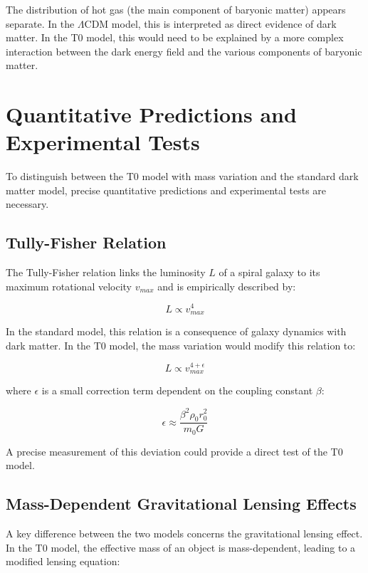 \documentclass[a4paper,12pt]{article}
\begin{document}
	The distribution of hot gas (the main component of baryonic matter) appears separate. In the $\Lambda$CDM model, this is interpreted as direct evidence of dark matter. In the T0 model, this would need to be explained by a more complex interaction between the dark energy field and the various components of baryonic matter.
	
	\section{Quantitative Predictions and Experimental Tests}
	
	To distinguish between the T0 model with mass variation and the standard dark matter model, precise quantitative predictions and experimental tests are necessary.
	
	\subsection{Tully-Fisher Relation}
	
	The Tully-Fisher relation links the luminosity $L$ of a spiral galaxy to its maximum rotational velocity $v_{max}$ and is empirically described by:
	
	\begin{equation}
		L \propto v_{max}^{4}
	\end{equation}
	
	In the standard model, this relation is a consequence of galaxy dynamics with dark matter. In the T0 model, the mass variation would modify this relation to:
	
	\begin{equation}
		L \propto v_{max}^{4+\epsilon}
	\end{equation}
	
	where $\epsilon$ is a small correction term dependent on the coupling constant $\beta$:
	
	\begin{equation}
		\epsilon \approx \frac{\beta^2 \rho_0 r_0^2}{m_0 G}
	\end{equation}
	
	A precise measurement of this deviation could provide a direct test of the T0 model.
	
	\subsection{Mass-Dependent Gravitational Lensing Effects}
	
	A key difference between the two models concerns the gravitational lensing effect. In the T0 model, the effective mass of an object is mass-dependent, leading to a modified lensing equation:
	
\end{document}

